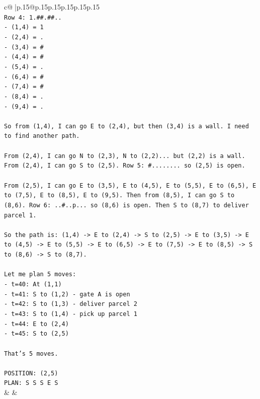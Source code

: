 \documentclass{article}
\begin{document}
{\begin{supertabular}{c@{$\;$}|p{.15\linewidth}@{}p{.15\linewidth}p{.15\linewidth}p{.15\linewidth}p{.15\linewidth}p{.15\linewidth}}
{{{\\ 
\texttt{Row 4: 1.\#\#.\#\#..} \\
\texttt{{-} (1,4) = 1} \\
\texttt{{-} (2,4) = .} \\
\texttt{{-} (3,4) = \#} \\
\texttt{{-} (4,4) = \#} \\
\texttt{{-} (5,4) = .} \\
\texttt{{-} (6,4) = \#} \\
\texttt{{-} (7,4) = \#} \\
\texttt{{-} (8,4) = .} \\
\texttt{{-} (9,4) = .} \\
\\ 
\texttt{So from (1,4), I can go E to (2,4), but then (3,4) is a wall. I need to find another path.} \\
\\ 
\texttt{From (2,4), I can go N to (2,3), N to (2,2)... but (2,2) is a wall. From (2,4), I can go S to (2,5). Row 5: \#........ so (2,5) is open.} \\
\\ 
\texttt{From (2,5), I can go E to (3,5), E to (4,5), E to (5,5), E to (6,5), E to (7,5), E to (8,5), E to (9,5). Then from (8,5), I can go S to (8,6). Row 6: ..\#..p... so (8,6) is open. Then S to (8,7) to deliver parcel 1.} \\
\\ 
\texttt{So the path is: (1,4) {-}> E to (2,4) {-}> S to (2,5) {-}> E to (3,5) {-}> E to (4,5) {-}> E to (5,5) {-}> E to (6,5) {-}> E to (7,5) {-}> E to (8,5) {-}> S to (8,6) {-}> S to (8,7).} \\
\\ 
\texttt{Let me plan 5 moves:} \\
\texttt{{-} t=40: At (1,1)} \\
\texttt{{-} t=41: S to (1,2) {-} gate A is open} \\
\texttt{{-} t=42: S to (1,3) {-} deliver parcel 2} \\
\texttt{{-} t=43: S to (1,4) {-} pick up parcel 1} \\
\texttt{{-} t=44: E to (2,4)} \\
\texttt{{-} t=45: S to (2,5)} \\
\\ 
\texttt{That's 5 moves.} \\
\\ 
\texttt{POSITION: (2,5)} \\
\texttt{PLAN: S S S E S} \\
            }
        }
    }
    & & \\ \\


\end{supertabular}}
\end{document}

